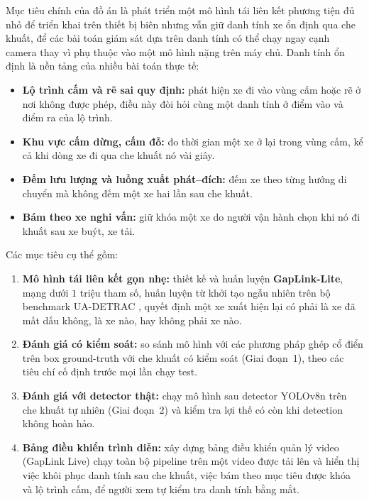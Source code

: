 Mục tiêu chính của đồ án là phát triển một mô hình tái liên kết phương tiện đủ nhỏ để triển khai trên thiết bị biên nhưng vẫn giữ danh tính xe ổn định qua che khuất, để các bài toán giám sát dựa trên danh tính có thể chạy ngay cạnh camera thay vì phụ thuộc vào một mô hình nặng trên máy chủ. Danh tính ổn định là nền tảng của nhiều bài toán thực tế:
\begin{itemize}
    \item \textbf{Lộ trình cấm và rẽ sai quy định:} phát hiện xe đi vào vùng cấm hoặc rẽ ở nơi không được phép, điều này đòi hỏi cùng một danh tính ở điểm vào và điểm ra của lộ trình.
    \item \textbf{Khu vực cấm dừng, cấm đỗ:} đo thời gian một xe ở lại trong vùng cấm, kể cả khi dòng xe đi qua che khuất nó vài giây.
    \item \textbf{Đếm lưu lượng và luồng xuất phát--đích:} đếm xe theo từng hướng di chuyển mà không đếm một xe hai lần sau che khuất.
    \item \textbf{Bám theo xe nghi vấn:} giữ khóa một xe do người vận hành chọn khi nó đi khuất sau xe buýt, xe tải.
\end{itemize}

Các mục tiêu cụ thể gồm:
\begin{enumerate}
    \item \textbf{Mô hình tái liên kết gọn nhẹ:} thiết kế và huấn luyện \textbf{GapLink-Lite}, mạng dưới $1$ triệu tham số, huấn luyện từ khởi tạo ngẫu nhiên trên bộ benchmark UA-DETRAC \cite{wen2020uadetrac}, quyết định một xe xuất hiện lại có phải là xe đã mất dấu không, là xe nào, hay không phải xe nào.
    \item \textbf{Đánh giá có kiểm soát:} so sánh mô hình với các phương pháp ghép cổ điển trên box ground-truth với che khuất có kiểm soát (Giai đoạn~1), theo các tiêu chí cố định trước mọi lần chạy test.
    \item \textbf{Đánh giá với detector thật:} chạy mô hình sau detector YOLOv8n trên che khuất tự nhiên (Giai đoạn~2) và kiểm tra lợi thế có còn khi detection không hoàn hảo.
    \item \textbf{Bảng điều khiển trình diễn:} xây dựng bảng điều khiển quản lý video (GapLink Live) chạy toàn bộ pipeline trên một video được tải lên và hiển thị việc khôi phục danh tính sau che khuất, việc bám theo mục tiêu được khóa và lộ trình cấm, để người xem tự kiểm tra danh tính bằng mắt.
\end{enumerate}

